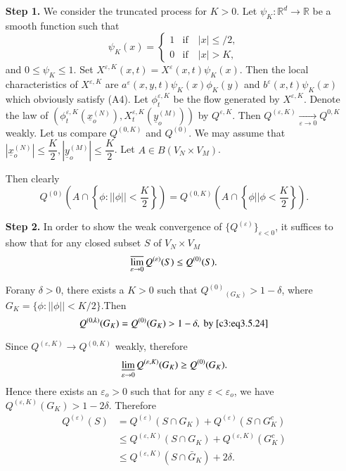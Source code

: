 \begin{enumerate}
\item[{\bf Step 1.}] We consider the truncated process for $K >
  0$. Let $\psi_K:\mathbb{R}^d \to \mathbb{R}$ be a smooth function
  such that  
  \begin{equation*}
    \psi_K(x) =
    \begin{cases}
      1 & \text{if} \quad  |x| \le / 2, \\
      0 & \text{if} \quad  |x| > K,
    \end{cases}
  \end{equation*}
  and $0 \le \psi_K\le 1$. Set $X^{\varepsilon, K}(x,t)=
  X^\varepsilon(x,t) \psi_K(x)$. Then the local characteristics of
  $X^{\varepsilon, K}$ are $a^\varepsilon(x,y,t) \psi_K(x) \phi_K(y)$ and
  $b^\varepsilon(x,t) \psi_K(x)$ which obviously satisfy (A4). Let
  $\phi^{\varepsilon, K}_t$ be the flow generated by
  $X^{\varepsilon,K}$. Denote the law of $(\phi^{\varepsilon,K}_t
  (\underline{x}_o^{(N)}), X^{\varepsilon,K}_t
  (\underline{y}_o^{(M)}))$ by  $Q^{\varepsilon, K}$. Then
  $Q^{(\varepsilon, K)} \xrightarrow[\varepsilon \to 0]{} Q^{0,K}$
  weakly. Let us compare $Q^{(0,K)}$ and $Q^{(0)}$. We may assume that
  $|\underline{x}_o^{(N)} | \le \dfrac{K}{2},| \underline{y}_o^{(M)}|
  \le \dfrac{K}{2}$. Let $A \in B(V_N \times  V_M)$.  

Then clearly
\begin{equation*}
  Q^{(0)} \left(A \cap \left\{ \phi: || \phi || <
  \frac{K}{2}\right\}\right) = Q^{(0,K)} \left(A 
  \cap \left\{\phi  || \phi < \frac{K}{2} \right\}\right). 
\tag{3.5.24}\label{c3:eq3.5.24} 
\end{equation*}


\item[{\bf Step 2.}]
In order to show the weak convergence of $\{
Q^{(\varepsilon)}\}_{\varepsilon < 0}$, it suffices to show that for
any  closed subset $S$ of $V_N \times  V_M$  
$$
\varlimsup_{\varepsilon \to 0} Q^{(\varepsilon)}(S) \le Q^{(0)} (S). 
$$

For\pageoriginale any $\delta > 0 $, there exists a $K > 0$ such that
$Q^{(0)}{_{(G_K)}} > 1 - \delta $, where $G_K= \{ \phi:  ||\phi || <
K/2\}$.Then 
\begin{equation*}
  Q^{(0,k)}(G_K) = Q^{(0)}(G_K) > 1 -\delta, ~\text{by }\eqref{c3:eq3.5.24}
\end{equation*}

Since $ Q^{(\varepsilon,K)} \to Q^{(0,K)} $ weakly, therefore
$$\varliminf\limits_{\varepsilon \to 0} Q^{(\varepsilon,K)}(G_K) \ge
Q^{(0)} (G_K).$$ 
Hence there exists an $\varepsilon_o > 0$ such that for any
$\varepsilon < \varepsilon_o$, we have $Q^{(\varepsilon,K)} (G_K) >
1-2 \delta$. Therefore   
\begin{align*}
  Q^{(\varepsilon)}(S) & = Q^{(\varepsilon)} (S \cap G_K) + Q
  ^{(\varepsilon)} (S \cap G^c_K) \\ 
  & \le Q^{(\varepsilon,K)} (S \cap G_K) + Q ^{(\varepsilon,K)} (G_K^c)\\
  & \le Q ^{(\varepsilon,K)} (S \cap \bar{G}_K)+2 \delta.
\end{align*}


\end{enumerate}
